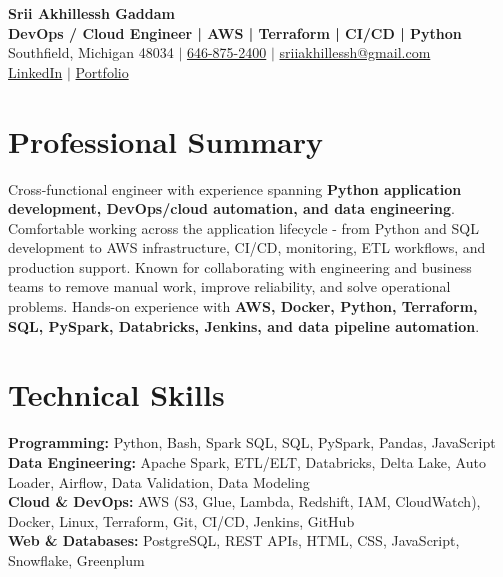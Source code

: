 \documentclass[letterpaper,10pt]{article}
\begin{document}
\fontsize{9.35pt}{10.45pt}\selectfont

\begin{center}
    {\LARGE \textbf{Srii Akhillessh Gaddam}} \\[-1pt]
    \textbf{DevOps / Cloud Engineer | AWS | Terraform | CI/CD | Python} \\[2pt]
    Southfield, Michigan 48034 $|$
    \href{tel:6468752400}{646-875-2400} $|$
    \href{mailto:sriiakhillessh@gmail.com}{sriiakhillessh@gmail.com} \\[1pt]
    \href{https://www.linkedin.com/in/srii-akhiilessh-gaddam-b48668191/}{LinkedIn} $|$
    \href{https://sriiakhillesshg.github.io/portfolio/}{Portfolio}
\end{center}
\vspace{-8pt}

\section{Professional Summary}
\small{Cross-functional engineer with experience spanning \textbf{Python application development, DevOps/cloud automation, and data engineering}. Comfortable working across the application lifecycle - from Python and SQL development to AWS infrastructure, CI/CD, monitoring, ETL workflows, and production support. Known for collaborating with engineering and business teams to remove manual work, improve reliability, and solve operational problems. Hands-on experience with \textbf{AWS, Docker, Python, Terraform, SQL, PySpark, Databricks, Jenkins, and data pipeline automation}.}

\section{Technical Skills}
\small{
\textbf{Programming:} Python, Bash, Spark SQL, SQL, PySpark, Pandas, JavaScript \\
\textbf{Data Engineering:} Apache Spark, ETL/ELT, Databricks, Delta Lake, Auto Loader, Airflow, Data Validation, Data Modeling \\
\textbf{Cloud \& DevOps:} AWS (S3, Glue, Lambda, Redshift, IAM, CloudWatch), Docker, Linux, Terraform, Git, CI/CD, Jenkins, GitHub \\
\textbf{Web \& Databases:} PostgreSQL, REST APIs, HTML, CSS, JavaScript, Snowflake, Greenplum
}
\end{document}
